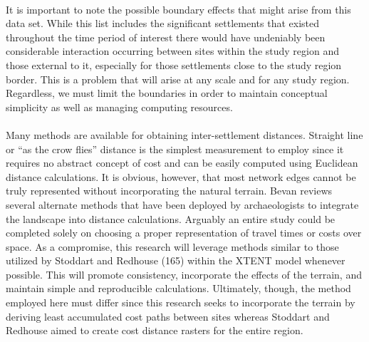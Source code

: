 \documentclass[12pt,a4paper]{thesis}
\begin{document}
 
\paragraph{}
It is important to note the possible boundary effects that might arise from this data set. While this list includes the significant settlements that existed throughout the time period of interest there would have undeniably been considerable interaction occurring between sites within the study region and those external to it, especially for those settlements close to the study region border. This is a problem that will arise at any scale and for any study region. Regardless, we must limit the boundaries in order to maintain conceptual simplicity as well as managing computing resources.  
	
\paragraph{}
Many  methods are available for obtaining inter-settlement distances. Straight line or ``as the crow flies'' distance is the simplest measurement to employ since it requires no abstract concept of cost and can be easily computed using Euclidean distance calculations. It is obvious, however, that most network edges cannot be truly represented without incorporating the natural terrain. Bevan \citeyearpar{BevForthcoming} reviews several alternate methods that have been deployed by archaeologists to integrate the landscape into distance calculations. Arguably an entire study could be completed solely on choosing a proper representation of travel times or costs over space. As a compromise, this research will leverage methods similar to those utilized by Stoddart and Redhouse (165) within the XTENT model whenever possible. This will promote consistency, incorporate the effects of the terrain, and  maintain simple and reproducible calculations. Ultimately, though, the method employed here must differ since this research seeks to incorporate the terrain by deriving least accumulated cost paths between sites whereas Stoddart and Redhouse aimed to create cost distance rasters for the entire region.
\end{document}
